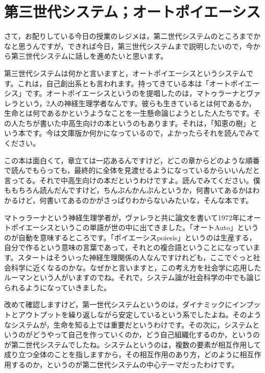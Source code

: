 \documentclass{ltjsbook}
\begin{document}
\section{第三世代システム；オートポイエーシス}

さて，お配りしている今日の授業のレジメは，第二世代システムのところまでかなと思うんですが，できれば今日，第三世代システムまで説明したいので，今から第三世代システムに話しを進めたいと思います。

第三世代システムは何かと言いますと，オートポイエーシスというシステムです。これは，自己創出系とも言われます。持ってきている本は「オートポイエーシス」\parencite{KawamotoHideo}です。オートポイエーシスというのを提唱したのは，マトゥラーナとヴァレラという，2人の神経生理学者なんです。彼らも生きているとは何であるか，生命とは何であるかというようなことを一生懸命論じようとした人たちです。その人たちが書いた中高生向けの本というのもあります。それは，「知恵の樹」という本です\parencite{Chienoki}。今は文庫版か何かになっているので，よかったらそれを読んでみてください。

この本は面白くて，章立ては一応あるんですけど，どこの章からどのような順番で読んでもらっても，最終的に全体を見渡せるようになっているからいいんだと言ってる。それで中高生向けの本だというわけですよ。読んでみてください。僕ももちろん読んだんですけど，ちんぷんかんぷんというか，何書いてあるかはわかるけど，何書いてあるのかがさっぱりわからないみたいな，そんな本です。

マトゥラーナという神経生理学者が，ヴァレラと共に論文を書いて1972年にオートポイエーシスというこの単語が世の中に出てきました。「オートAuto」というのが自動を意味するところです。「ポイエーシスpoiesis」というのは生産する，自分で作るという意味の言葉であって，それとの複合語ということになっています。スタートはそういった神経生理関係の人なんですけれども，ここでぐっと社会科学に近くなるのかな。なぜかと言いますと，この考え方を社会学に応用したルーマンという人がいますのでね。それで，システム論が社会科学の中でも論じられるようになっていきました。

改めて確認しますけど，第一世代システムというのは，ダイナミックにインプットとアウトプットを繰り返しながら安定しているという系でしたよね。そのようなシステムが，生命を知る上では重要だというわけです。その次に，システムというのがどうやって自己を作っていくのか，どう自己組織化するのか，というのが第二世代システムでしたね。システムというのは，複数の要素が相互作用して成り立つ全体のことを指しますから，その相互作用のあり方，どのように相互作用するのか，というのが第二世代システムの中心テーマだったわけです。
\end{document}
